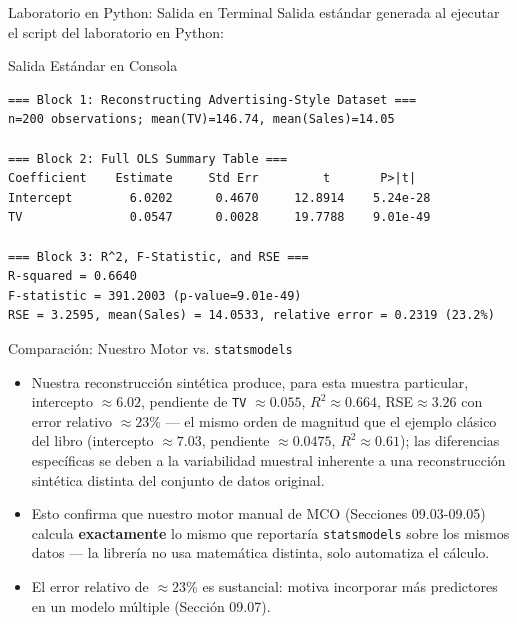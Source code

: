 \documentclass[10pt, aspectratio=169]{beamer}
\begin{document}
\begin{frame}[fragile]{Laboratorio en Python: Salida en Terminal}
  \scriptsize
  Salida estándar generada al ejecutar el script del laboratorio en Python:
  \vspace{0.02cm}
  \begin{block}{Salida Estándar en Consola}
    \fontsize{3.4pt}{4.1pt}\selectfont
    \begin{verbatim}
=== Block 1: Reconstructing Advertising-Style Dataset ===
n=200 observations; mean(TV)=146.74, mean(Sales)=14.05

=== Block 2: Full OLS Summary Table ===
Coefficient    Estimate     Std Err         t       P>|t|
Intercept        6.0202      0.4670     12.8914    5.24e-28
TV               0.0547      0.0028     19.7788    9.01e-49

=== Block 3: R^2, F-Statistic, and RSE ===
R-squared = 0.6640
F-statistic = 391.2003 (p-value=9.01e-49)
RSE = 3.2595, mean(Sales) = 14.0533, relative error = 0.2319 (23.2%)
    \end{verbatim}
  \end{block}
\end{frame}

\begin{frame}{Comparación: Nuestro Motor vs. \texttt{statsmodels}}
  \footnotesize
  \begin{itemize}\itemsep=0.12cm
    \item Nuestra reconstrucción sintética produce, para esta muestra particular, intercepto $\approx6.02$, pendiente de \texttt{TV} $\approx0.055$, $R^2\approx0.664$, RSE$\approx3.26$ con error relativo $\approx23\%$ --- el mismo orden de magnitud que el ejemplo clásico del libro (intercepto $\approx7.03$, pendiente $\approx0.0475$, $R^2\approx0.61$); las diferencias específicas se deben a la variabilidad muestral inherente a una reconstrucción sintética distinta del conjunto de datos original. \pause
    \item Esto confirma que nuestro motor manual de MCO (Secciones 09.03-09.05) calcula \textbf{exactamente} lo mismo que reportaría \texttt{statsmodels} sobre los mismos datos --- la librería no usa matemática distinta, solo automatiza el cálculo. \pause
    \item El error relativo de $\approx23\%$ es sustancial: motiva incorporar más predictores en un modelo múltiple (Sección 09.07).
  \end{itemize}
\end{frame}
\end{document}
